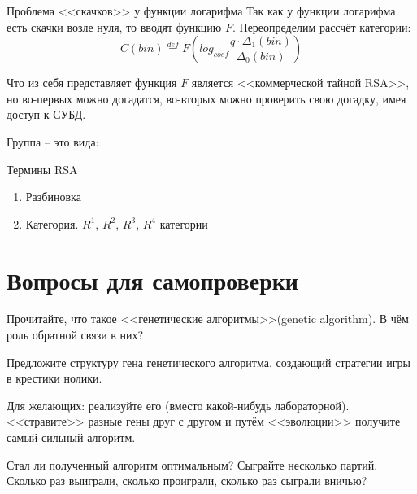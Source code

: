 \begin{frame}{Проблема <<скачков>> у функции логарифма}
	Так как у функции логарифма есть скачки возле нуля, то вводят  функцию $F$. Переопределим рассчёт категории:
	\begin{equation}
	C(bin) \stackrel{def}{=} F \left( log_{coef} \frac{q \cdot \Delta_1 (bin)}{\Delta_0 (bin)} \right)
	\end{equation}
	
	Что из себя представляет функция $F$ является <<коммерческой тайной RSA>>, 
	но во-первых можно догадатся, во-вторых можно проверить свою догадку, имея доступ к СУБД.
	
\end{frame}

\begin{frame}{Группа}
	 -- это 
	вида:
	\begin{equation}
	
	\end{equation}
\end{frame}


\begin{frame}{Термины RSA}\label{frame:rsa_risk_engine_terms}
	\begin{enumerate}
		\item Разбиновка 
		\item Категория. $R^1$, $R^2$, $R^3$, $R^4$ категории
	
	\end{enumerate}
\end{frame}


  
\section{Вопросы для самопроверки}

\begin{frame}
	Прочитайте, что такое <<генетические алгоритмы>>(genetic algorithm).
	В чём роль обратной связи в них?
	
	Предложите структуру гена генетического алгоритма, создающий стратегии игры в крестики нолики. 
	
	Для желающих: реализуйте его (вместо какой-нибудь лабораторной). 
	<<стравите>> разные гены друг с другом и путём <<эволюции>>
	получите самый сильный алгоритм.
	
	Стал ли полученный алгоритм оптимальным? Сыграйте несколько партий. Сколько раз выиграли, 
	сколько проиграли, сколько раз сыграли вничью?
	
\end{frame}

